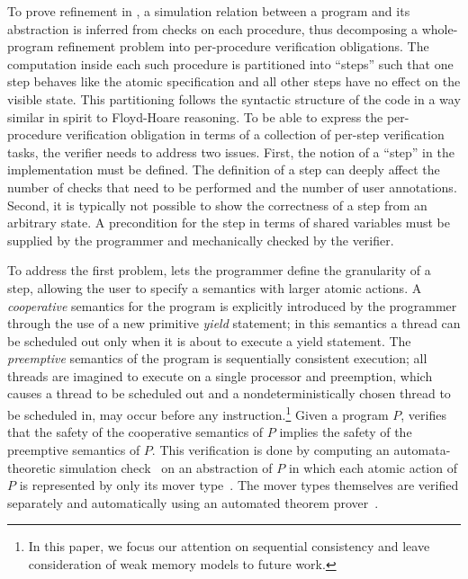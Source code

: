To prove refinement in \civl, a simulation relation between a program and its abstraction is inferred 
from checks on each procedure, thus decomposing a whole-program refinement problem into per-procedure verification obligations. 
The computation inside each such procedure is partitioned into ``steps'' 
such that one step behaves like the atomic specification and all other steps have no effect on the visible state. 
This partitioning follows the syntactic structure of the code in a way similar in spirit to Floyd-Hoare reasoning. 
To be able to express the per-procedure verification obligation in terms of a collection of per-step verification tasks, the \civl verifier needs to address two issues.
First, the notion of a ``step'' in the implementation must be defined.
The definition of a step can deeply affect the number of checks that need to be performed and the number of user annotations.
Second, it is typically not possible to show the correctness of a step from an arbitrary state.
A precondition for the step in terms of shared variables must be supplied by the programmer and mechanically checked by the verifier.

To address the first problem, \civl lets the programmer define the granularity of a step, allowing the user to specify a semantics with larger atomic actions. 
A {\em cooperative\/} semantics for the program is explicitly introduced by the programmer 
through the use of a new primitive {\em yield\/} statement;
in this semantics a thread can be scheduled out only when it is about to execute a yield statement.
The {\em preemptive\/} semantics of the program is sequentially consistent execution; all threads are imagined
to execute on a single processor and preemption, which causes a thread to be scheduled out and a nondeterministically chosen thread to 
be scheduled in, may occur before any instruction.\footnote{In this paper, 
we focus our attention on sequential consistency and leave consideration of weak memory models to future work.}
Given a program $P$, \civl verifies that the safety of the cooperative semantics of $P$ implies the safety of the preemptive semantics of $P$.
This verification is done by computing an automata-theoretic simulation check~\cite{HenzingerHK95} 
on an abstraction of $P$ in which each atomic action of $P$ is represented by only its mover type~\cite{Lipton75,FlanaganFLQ08}. 
The mover types themselves are verified separately and automatically using an automated theorem prover~\cite{MouraB08}.

